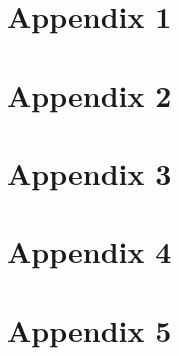 \begin{appendix}
\chapter{Appendix 1}
\chapter{Appendix 2}
\chapter{Appendix 3}
\chapter{Appendix 4}
\chapter{Appendix 5}
\end{appendix}
